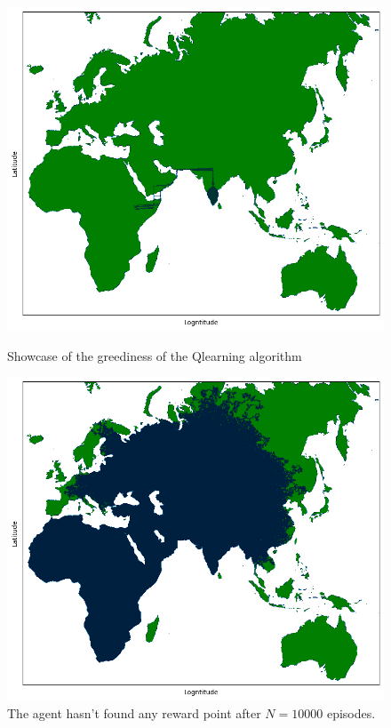 \documentclass[11pt]{article}
\begin{document}
\begin{figure}[h!]
    \begin{minipage}{0.49\textwidth}
        \includegraphics[scale=0.3]{Files/Images/greed.png}
        \caption{Showcase of the greediness of the Qlearning algorithm}
    \end{minipage}
    \begin{minipage}{0.49\textwidth}
        \includegraphics[scale=0.3]{Files/Images/inefficient.png}
        \caption{The agent hasn't found any reward point after $N=10000$ episodes.}
    \end{minipage}
\end{figure}
\end{document}
